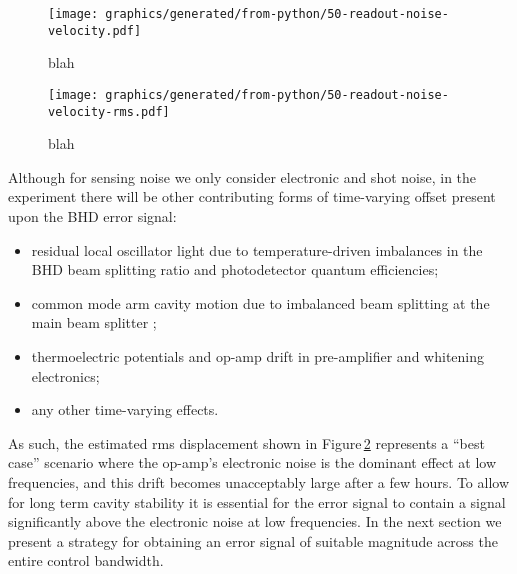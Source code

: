 \begin{figure}
  \centering
  \texttt{[image: graphics/generated/from-python/50-readout-noise-velocity.pdf]}
  \caption{\label{fig:readout-noise-velocity}blah}
\end{figure}

\begin{figure}
  \centering
  \texttt{[image: graphics/generated/from-python/50-readout-noise-velocity-rms.pdf]}
  \caption{\label{fig:readout-noise-velocity-rms}blah}
\end{figure}


Although for sensing noise we only consider electronic and shot noise, in the experiment there will be other contributing forms of time-varying offset present upon the \gls{BHD} error signal:
\begin{itemize}
  \item residual local oscillator light due to temperature-driven imbalances in the \gls{BHD} beam splitting ratio and photodetector quantum efficiencies;
  \item common mode arm cavity motion due to imbalanced beam splitting at the main beam splitter \cite{Danilishin2015};
  \item thermoelectric potentials and op-amp drift in pre-amplifier and whitening electronics;
  \item any other time-varying effects.
\end{itemize}
As such, the estimated rms displacement shown in Figure\,\ref{fig:readout-noise-velocity-rms} represents a ``best case'' scenario where the op-amp's electronic noise is the dominant effect at low frequencies, and this drift becomes unacceptably large after a few hours. To allow for long term cavity stability it is essential for the error signal to contain a signal significantly above the electronic noise at low frequencies. In the next section we present a strategy for obtaining an error signal of suitable magnitude across the entire control bandwidth.
 

